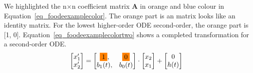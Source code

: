 

We highlighted the n$\times$n coefficient matrix \textbf{A} in orange and blue colour in Equation~\ref{eq_foodeexamplecolor}. The orange part is an matrix looks like an identity matrix. For the lowest higher-order ODE second-order, the orange part is [1, 0]. Equation~\ref{eq_foodeexamplecolortwo} shows a completed transformation for a second-order ODE.
\begin{equation} \label{eq_foodeexamplecolortwo}
	\begin{bmatrix}
		{x_{1}'} \\
    {x_{2}'} 
	\end{bmatrix}
    = 
  \begin{bmatrix}
		\highlight{orange}{1}, & \highlight{orange}{0} \\
    {b_{1}(t)}, & {b_{0}(t)}
	\end{bmatrix}
    \cdot
  \begin{bmatrix}
		{x_{2}} \\
    {x_{1}} 
	\end{bmatrix}
    + 
  \begin{bmatrix}
    {0} \\
    {h(t)}
	\end{bmatrix}
\end{equation}

